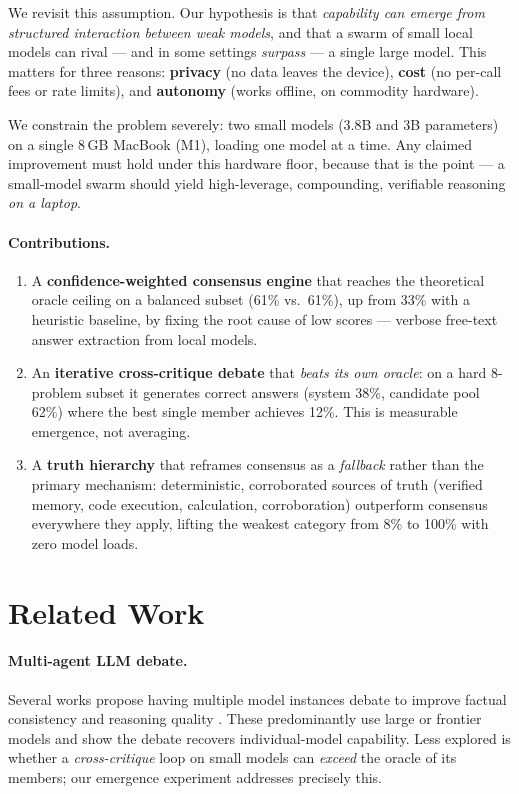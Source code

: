 \documentclass[10pt,twocolumn]{article}
\begin{document}
We revisit this assumption. Our hypothesis is that \emph{capability can emerge
from structured interaction between weak models}, and that a swarm of small
local models can rival --- and in some settings \emph{surpass} --- a single
large model. This matters for three reasons: \textbf{privacy} (no data leaves
the device), \textbf{cost} (no per-call fees or rate limits), and
\textbf{autonomy} (works offline, on commodity hardware).

We constrain the problem severely: two small models (3.8B and 3B parameters)
on a single 8\,GB MacBook (M1), loading one model at a time. Any claimed
improvement must hold under this hardware floor, because that is the point ---
a small-model swarm should yield high-leverage, compounding, verifiable
reasoning \emph{on a laptop}.

\paragraph{Contributions.}
\begin{enumerate}
  \item A \textbf{confidence-weighted consensus engine} that reaches the
        theoretical oracle ceiling on a balanced subset (61\% vs.\ 61\%), up
        from 33\% with a heuristic baseline, by fixing the root cause of low
        scores --- verbose free-text answer extraction from local models.
  \item An \textbf{iterative cross-critique debate} that \emph{beats its own
        oracle}: on a hard 8-problem subset it generates correct answers
        (system 38\%, candidate pool 62\%) where the best single member
        achieves 12\%. This is measurable emergence, not averaging.
  \item A \textbf{truth hierarchy} that reframes consensus as a \emph{fallback}
        rather than the primary mechanism: deterministic, corroborated sources
        of truth (verified memory, code execution, calculation, corroboration)
        outperform consensus everywhere they apply, lifting the weakest
        category from 8\% to 100\% with zero model loads.
\end{enumerate}

\section{Related Work}
\paragraph{Multi-agent LLM debate.} Several works propose having multiple model
instances debate to improve factual consistency and reasoning quality
\cite{du2023improving, liang2023encouraging, irving2018debate}. These
predominantly use large or frontier models and show the debate recovers
individual-model capability. Less explored is whether a \emph{cross-critique}
loop on small models can \emph{exceed} the oracle of its members; our
emergence experiment addresses precisely this.
\end{document}
